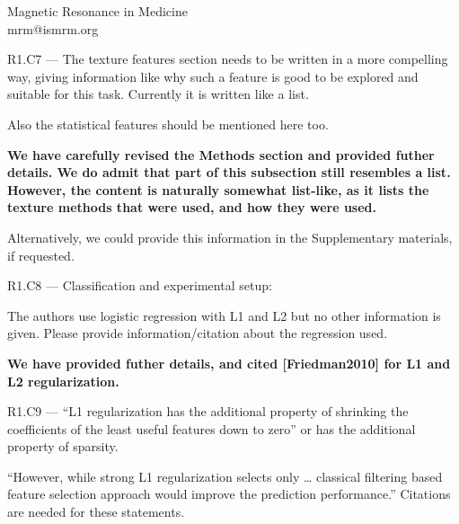\documentclass{letter}
\newenvironment{comment}[1]%
  {\vspace{5ex}\par\textsf{#1 ---} \ignorespaces}%
  {\par\ignorespacesafterend}
\newenvironment{reply}%
  {\vspace{2ex}\par\bfseries}%
  {\par\upshape}
\providecommand{\citet}[1]{[#1]}
\begin{document}
\begin{letter}{Magnetic Resonance in Medicine \\ mrm@ismrm.org}
\begin{comment}{R1.C7}
The texture features section needs to be written in a more compelling way,
giving information like why such a feature is good to be explored and suitable
for this task. Currently it is written like a list.

Also the statistical features should be mentioned here too.
\end{comment}

\begin{reply}
We have carefully revised the Methods section and provided futher details. We do
admit that part of this subsection still resembles a list. However, the content
is naturally somewhat list-like, as it lists the texture methods that were used,
and how they were used.

Alternatively, we could provide this information in the Supplementary materials,
if requested.
\end{reply}


\begin{comment}{R1.C8}
Classification and experimental setup:

The authors use logistic regression with L1 and L2 but no other information is
given. Please provide information/citation about the regression used.
\end{comment}

\begin{reply}
We have provided futher details, and cited \citet{Friedman2010} for L1 and L2
regularization.
\end{reply}



\begin{comment}{R1.C9}
“L1 regularization has the additional property of shrinking the coefficients of
the least useful features down to zero” or has the additional property of
sparsity.

“However, while strong L1 regularization selects only … classical filtering
based feature selection approach would improve the prediction performance.”
Citations are needed for these statements.
\end{comment}



\end{letter}
\end{document}
